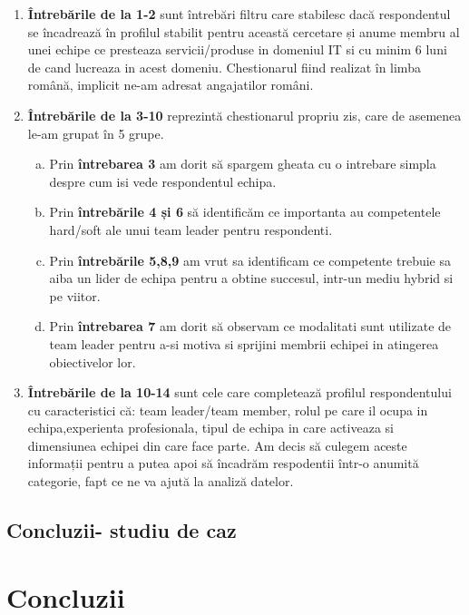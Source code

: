 \documentclass[a4paper, 12pt]{article}
\begin{document}
\begin{enumerate}[(1)]
			\item\textbf{Întrebările de la 1-2}  sunt întrebări filtru care stabilesc dacă respondentul se încadrează în profilul stabilit pentru această cercetare și anume membru al unei echipe ce presteaza servicii/produse in domeniul IT si cu minim 6 luni de cand lucreaza in acest domeniu. Chestionarul fiind realizat în limba română, implicit ne-am adresat angajatilor români. 
			\item\textbf{Întrebările de la 3-10} reprezintă chestionarul propriu zis, care de asemenea le-am grupat în 5 grupe.
		\begin{enumerate}[(a)]
			\item Prin \textbf{întrebarea 3} am dorit să spargem gheata cu o intrebare simpla despre cum isi vede respondentul echipa.
			\item Prin \textbf{întrebările 4 și 6} să identificăm ce importanta au competentele hard/soft ale unui team leader pentru respondenti.
			\item Prin \textbf{întrebările 5,8,9} am vrut sa identificam ce competente trebuie sa aiba un lider de echipa pentru a obtine succesul, intr-un mediu hybrid si pe viitor.
			\item Prin \textbf{întrebarea 7} am dorit să observam ce modalitati sunt utilizate de team leader pentru a-si motiva si sprijini membrii echipei in atingerea obiectivelor lor.
		\end{enumerate}
		\item\textbf{Întrebările de la 10-14} sunt cele care completează profilul respondentului cu caracteristici că: team leader/team member, rolul pe care il ocupa in echipa,experienta profesionala, tipul de echipa in care activeaza si dimensiunea echipei din care face parte. Am decis să culegem aceste informații pentru a putea apoi să încadrăm respodentii într-o anumită categorie, fapt ce ne va ajută la analiză datelor.
	\end{enumerate}




	\subsection{ Concluzii- studiu de caz}

\newpage
\setcounter{section}{3}
	\section{Concluzii}	
\end{document}
